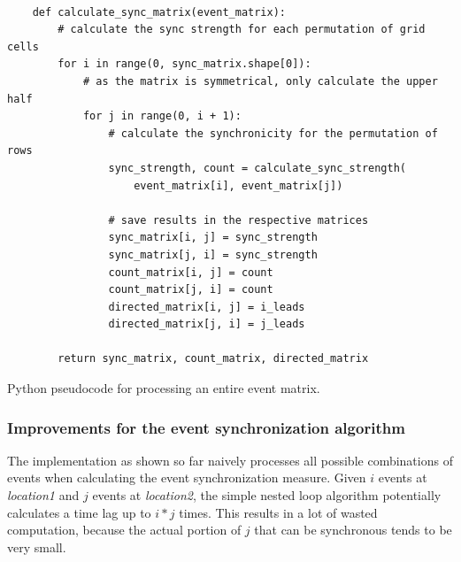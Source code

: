 \begin{listing}[H]
  \begin{verbatim}

    def calculate_sync_matrix(event_matrix):
        # calculate the sync strength for each permutation of grid cells
        for i in range(0, sync_matrix.shape[0]):
            # as the matrix is symmetrical, only calculate the upper half
            for j in range(0, i + 1):
                # calculate the synchronicity for the permutation of rows
                sync_strength, count = calculate_sync_strength(
                    event_matrix[i], event_matrix[j])

                # save results in the respective matrices
                sync_matrix[i, j] = sync_strength
                sync_matrix[j, i] = sync_strength
                count_matrix[i, j] = count
                count_matrix[j, i] = count
                directed_matrix[i, j] = i_leads
                directed_matrix[j, i] = j_leads

        return sync_matrix, count_matrix, directed_matrix

  \end{verbatim}
  \caption{Python pseudocode for processing an entire event matrix.}
  \label{lst:sync_matrix}
\end{listing}

\subsubsection{Improvements for the event synchronization algorithm}
The implementation as shown so far naively processes all possible combinations of events when calculating the event synchronization measure. Given $i$ events at \textit{location1} and $j$ events at \textit{location2}, the simple nested loop algorithm potentially calculates a time lag up to $i * j$ times. This results in a lot of wasted computation, because the actual portion of $j$ that can be synchronous tends to be very small.

